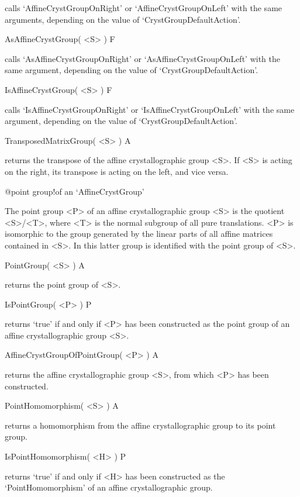 calls `AffineCrystGroupOnRight' or `AffineCrystGroupOnLeft' with
the same arguments, depending on the value of `CrystGroupDefaultAction'.

\>AsAffineCrystGroup( <S> ) F

calls `AsAffineCrystGroupOnRight' or `AsAffineCrystGroupOnLeft' with
the same argument, depending on the value of `CrystGroupDefaultAction'.

\>IsAffineCrystGroup( <S> ) F

calls `IsAffineCrystGroupOnRight' or `IsAffineCrystGroupOnLeft' with
the same argument, depending on the value of `CrystGroupDefaultAction'.

\>TransposedMatrixGroup( <S> ) A

returns the transpose of the affine crystallographic group <S>. 
If <S> is acting on the right, its transpose is acting on the left,
and vice versa.



%
{@point group!of an \noexpand`AffineCrystGroup'}

The point group <P> of an affine crystallographic group <S> is the
quotient <S>/<T>, where <T> is the normal subgroup of all pure 
translations. <P> is isomorphic to the group generated by the
linear parts of all affine matrices contained in <S>. In {\Cryst}
this latter group is identified with the point group of <S>.

\>PointGroup( <S> ) A

returns the point group of <S>.

\>IsPointGroup( <P> ) P

returns `true' if and only if <P> has been constructed as the
point group of an affine crystallographic group <S>.

\>AffineCrystGroupOfPointGroup( <P> ) A

returns the affine crystallographic group <S>, from which <P> has
been constructed.

\>PointHomomorphism( <S> ) A

returns a homomorphism from the affine crystallographic group to its
point group.

\>IsPointHomomorphism( <H> ) P

returns `true' if and only if <H> has been constructed as the 
`PointHomomorphism' of an affine crystallographic group.



